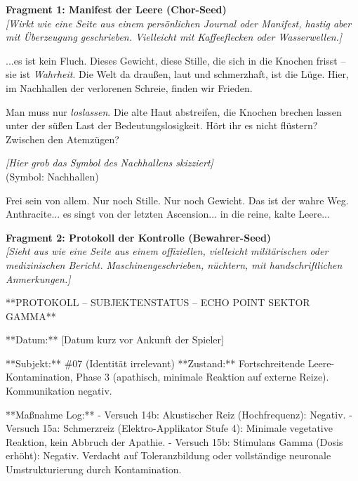 \documentclass[10pt, a4paper]{article}
\begin{document}
\pagestyle{empty} %


\textbf{Fragment 1: Manifest der Leere (Chor-Seed)} \\
\textit{[Wirkt wie eine Seite aus einem persönlichen Journal oder Manifest, hastig aber mit Überzeugung geschrieben. Vielleicht mit Kaffeeflecken oder Wasserwellen.]}

...es ist kein Fluch. Dieses Gewicht, diese Stille, die sich in die Knochen frisst – sie ist \textit{Wahrheit}. Die Welt da draußen, laut und schmerzhaft, ist die Lüge. Hier, im Nachhallen der verlorenen Schreie, finden wir Frieden.

Man muss nur \textit{loslassen}. Die alte Haut abstreifen, die Knochen brechen lassen unter der süßen Last der Bedeutungslosigkeit. Hört ihr es nicht flüstern? Zwischen den Atemzügen?

\begin{center}
    \vspace{0.5em}
    \textit{[Hier grob das Symbol des Nachhallens skizziert]} \\
    (Symbol: Nachhallen)
    \vspace{0.5em}
\end{center}

Frei sein von allem. Nur noch Stille. Nur noch Gewicht. Das ist der wahre Weg. Anthracite... es singt von der letzten Ascension... in die reine, kalte Leere...

\vspace{1cm} %
\hrulefill
\vspace{1cm} %


\textbf{Fragment 2: Protokoll der Kontrolle (Bewahrer-Seed)} \\
\textit{[Sieht aus wie eine Seite aus einem offiziellen, vielleicht militärischen oder medizinischen Bericht. Maschinengeschrieben, nüchtern, mit handschriftlichen Anmerkungen.]}

**PROTOKOLL – SUBJEKTENSTATUS – ECHO POINT SEKTOR GAMMA**

**Datum:** [Datum kurz vor Ankunft der Spieler]

**Subjekt:** \#07 (Identität irrelevant)
**Zustand:** Fortschreitende Leere-Kontamination, Phase 3 (apathisch, minimale Reaktion auf externe Reize). Kommunikation negativ.

**Maßnahme Log:**
- Versuch 14b: Akustischer Reiz (Hochfrequenz): Negativ.
- Versuch 15a: Schmerzreiz (Elektro-Applikator Stufe 4): Minimale vegetative Reaktion, kein Abbruch der Apathie.
- Versuch 15b: Stimulans Gamma (Dosis erhöht): Negativ. Verdacht auf Toleranzbildung oder vollständige neuronale Umstrukturierung durch Kontamination.
\end{document}

